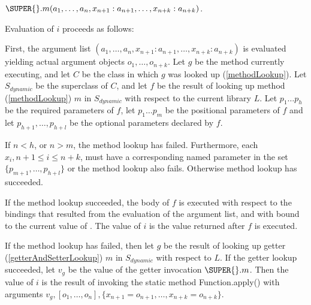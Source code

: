\documentclass{article}
\newcommand{\code}[1]{{\sf #1}}
\begin{document}
$\SUPER{}.m(a_1, \ldots , a_n, x_{n+1}: a_{n+1}, \ldots , x_{n+k}: a_{n+k})$.

\LMHash{}
Evaluation of $i$ proceeds as follows:

\LMHash{}
First, the argument list $(a_1, \ldots , a_n, x_{n+1}: a_{n+1}, \ldots , x_{n+k}: a_{n+k})$ is evaluated  yielding actual argument objects $o_1, \ldots , o_{n+k}$. Let $g$ be the method currently executing, and let $C$ be the class in which $g$ was looked up (\ref{methodLookup}). Let $S_{dynamic}$ be the superclass of $C$, and let $f$ be the result of looking up method (\ref{methodLookup})  $m$ in $S_{dynamic}$  with respect to the current library $L$.
Let $p_1 \ldots p_h$ be the required parameters of $f$,  let $p_1 \ldots p_m$ be the positional parameters of $f$ and let $p_{h+1}, \ldots, p_{h+l}$ be the optional parameters declared by $f$.

\LMHash{}
If  $n < h$, or $n > m$, the method lookup has failed. Furthermore, each $x_i, n+1 \le i \le n+k$,  must have a corresponding named parameter in the set $\{p_{m+1}, \ldots, p_{h+l}\}$ or the method lookup also fails.  Otherwise method lookup has succeeded.

\LMHash{}
If the method lookup succeeded, the body of $f$ is executed with respect to the bindings that resulted from the evaluation of the argument list, and with \THIS{} bound to the current value of \THIS{}. The value of $i$ is the value returned after $f$ is executed.

\LMHash{}
If the method lookup has failed, then let $g$ be the result of looking up getter (\ref{getterAndSetterLookup}) $m$ in $S_{dynamic}$ with respect to $L$. If the getter lookup succeeded, let $v_g$ be the value of the getter invocation $\SUPER{}.m$. Then the value of $i$ is the result of invoking
the static method \code{Function.apply()} with arguments $v_g, [o_1, \ldots , o_n], \{x_{n+1} = o_{n+1}, \ldots , x_{n+k} = o_{n+k}\}$.
\end{document}

